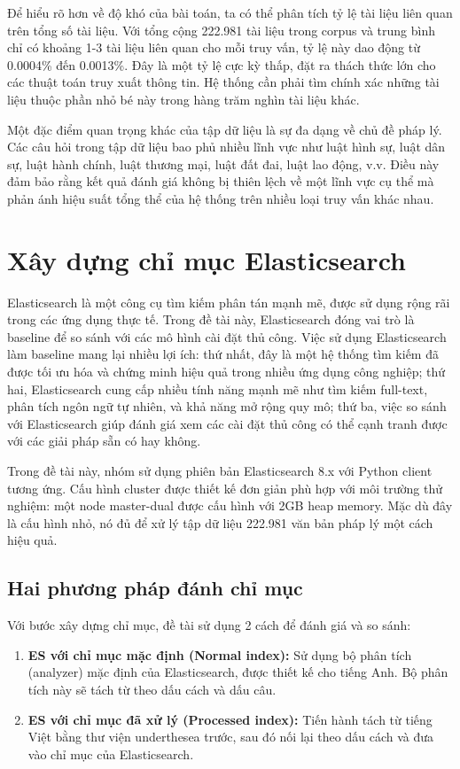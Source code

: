 \documentclass[../BTL.tex]{subfiles}
\begin{document}
Để hiểu rõ hơn về độ khó của bài toán, ta có thể phân tích tỷ lệ tài liệu liên quan trên tổng số tài liệu. Với tổng cộng 222.981 tài liệu trong corpus và trung bình chỉ có khoảng 1-3 tài liệu liên quan cho mỗi truy vấn, tỷ lệ này dao động từ 0.0004\% đến 0.0013\%. Đây là một tỷ lệ cực kỳ thấp, đặt ra thách thức lớn cho các thuật toán truy xuất thông tin. Hệ thống cần phải tìm chính xác những tài liệu thuộc phần nhỏ bé này trong hàng trăm nghìn tài liệu khác.

Một đặc điểm quan trọng khác của tập dữ liệu là sự đa dạng về chủ đề pháp lý. Các câu hỏi trong tập dữ liệu bao phủ nhiều lĩnh vực như luật hình sự, luật dân sự, luật hành chính, luật thương mại, luật đất đai, luật lao động, v.v. Điều này đảm bảo rằng kết quả đánh giá không bị thiên lệch về một lĩnh vực cụ thể mà phản ánh hiệu suất tổng thể của hệ thống trên nhiều loại truy vấn khác nhau.


\section{Xây dựng chỉ mục Elasticsearch}
Elasticsearch là một công cụ tìm kiếm phân tán mạnh mẽ, được sử dụng rộng rãi trong các ứng dụng thực tế. Trong đề tài này, Elasticsearch đóng vai trò là baseline để so sánh với các mô hình cài đặt thủ công. Việc sử dụng Elasticsearch làm baseline mang lại nhiều lợi ích: thứ nhất, đây là một hệ thống tìm kiếm đã được tối ưu hóa và chứng minh hiệu quả trong nhiều ứng dụng công nghiệp; thứ hai, Elasticsearch cung cấp nhiều tính năng mạnh mẽ như tìm kiếm full-text, phân tích ngôn ngữ tự nhiên, và khả năng mở rộng quy mô; thứ ba, việc so sánh với Elasticsearch giúp đánh giá xem các cài đặt thủ công có thể cạnh tranh được với các giải pháp sẵn có hay không.

Trong đề tài này, nhóm sử dụng phiên bản Elasticsearch 8.x với Python client tương ứng. Cấu hình cluster được thiết kế đơn giản phù hợp với môi trường thử nghiệm: một node master-dual được cấu hình với 2GB heap memory. Mặc dù đây là cấu hình nhỏ, nó đủ để xử lý tập dữ liệu 222.981 văn bản pháp lý một cách hiệu quả.

\subsection*{Hai phương pháp đánh chỉ mục}
Với bước xây dựng chỉ mục, đề tài sử dụng 2 cách để đánh giá và so sánh:

\begin{enumerate}
    \item \textbf{ES với chỉ mục mặc định (Normal index):} Sử dụng bộ phân tích (analyzer) mặc định của Elasticsearch, được thiết kế cho tiếng Anh. Bộ phân tích này sẽ tách từ theo dấu cách và dấu câu.
    \item \textbf{ES với chỉ mục đã xử lý (Processed index):} Tiến hành tách từ tiếng Việt bằng thư viện underthesea trước, sau đó nối lại theo dấu cách và đưa vào chỉ mục của Elasticsearch.
\end{enumerate}
\end{document}
